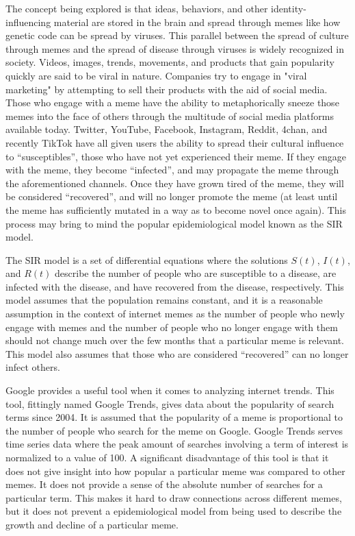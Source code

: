 \documentclass[12pt, letterpaper]{article}
\begin{document}
The concept being explored is that ideas, behaviors, and other identity-influencing material are stored in the brain and spread through memes like how genetic code can be spread by viruses. This parallel between the spread of culture through memes and the spread of disease through viruses is widely recognized in society. Videos, images, trends, movements, and products that gain popularity quickly are said to be viral in nature. Companies try to engage in "viral marketing" by attempting to sell their products with the aid of social media. Those who engage with a meme have the ability to metaphorically sneeze those memes into the face of others through the multitude of social media platforms available today. Twitter, YouTube, Facebook, Instagram, Reddit, 4chan, and recently TikTok have all given users the ability to spread their cultural influence to “susceptibles”, those who have not yet experienced their meme. If they engage with the meme, they become “infected”, and may propagate the meme through the aforementioned channels. Once they have grown tired of the meme, they will be considered “recovered”, and will no longer promote the meme (at least until the meme has sufficiently mutated in a way as to become novel once again). This process may bring to mind the popular epidemiological model known as the SIR model.

The SIR model \cite{kermack1927contribution} is a set of differential equations where the solutions $S(t)$, $I(t)$, and $R(t)$ describe the number of people who are susceptible to a disease, are infected with the disease, and have recovered from the disease, respectively. This model assumes that the population remains constant, and it is a reasonable assumption in the context of internet memes as the number of people who newly engage with memes and the number of people who no longer engage with them should not change much over the few months that a particular meme is relevant. This model also assumes that those who are considered “recovered” can no longer infect others.

Google provides a useful tool when it comes to analyzing internet trends. This tool, fittingly named Google Trends, gives data about the popularity of search terms since 2004. It is assumed that the popularity of a meme is proportional to the number of people who search for the meme on Google. Google Trends serves time series data where the peak amount of searches involving a term of interest is normalized to a value of 100. A significant disadvantage of this tool is that it does not give insight into how popular a particular meme was compared to other memes. It does not provide a sense of the absolute number of searches for a particular term. This makes it hard to draw connections across different memes, but it does not prevent a epidemiological model from being used to describe the growth and decline of a particular meme.
\end{document}
